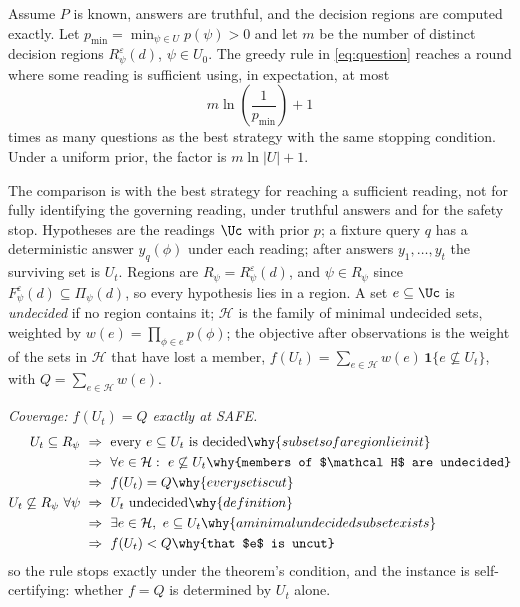 \begin{theorem}
\label{thm:query}\label{thm:questions}
Assume \(P\) is known, answers are truthful, and the decision regions are computed
exactly. Let \(p_{\min}=\min_{\psi\in U}p(\psi)>0\) and let \(m\) be the number of
distinct decision regions \(R^\varepsilon_\psi(d)\), \(\psi\in U_0\). The greedy rule
in \eqref{eq:question} reaches a round where some reading is sufficient using, in
expectation, at most
\[
m\ln\!\left(\frac{1}{p_{\min}}\right)+1
\]
times as many questions as the best strategy with the same stopping condition.
Under a uniform prior, the factor is \(m\ln|U|+1\).
\end{theorem}
The comparison is with the best strategy for reaching a sufficient reading, not for
fully identifying the governing reading, under truthful answers and for the safety stop.
Hypotheses are the readings $\Uc$ with prior $p$; a fixture query $q$ has a
deterministic answer $y_q(\phi)$ under each reading; after answers
$y_1,\dots,y_t$ the surviving set is $U_t$. Regions are
$R_\psi=R^\varepsilon_\psi(d)$, and $\psi\in R_\psi$ since
$F^\varepsilon_\psi(d)\subseteq\Pi_\psi(d)$, so every hypothesis lies in a
region. A set $e\subseteq\Uc$ is \emph{undecided} if no region contains it;
$\mathcal H$ is the family of minimal undecided sets, weighted by
$w(e)=\prod_{\phi\in e}p(\phi)$; the objective after observations is the
weight of the sets in $\mathcal H$ that have lost a member,
$f(U_t)=\sum_{e\in\mathcal H}w(e)\,\mathbf 1\{e\not\subseteq U_t\}$, with
$Q=\sum_{e\in\mathcal H}w(e)$.

\emph{Coverage: $f(U_t)=Q$ exactly at SAFE.}
\begin{align*}
U_t\subseteq R_\psi\ &\Rightarrow\ \text{every }e\subseteq U_t\text{ is decided}
   \why{subsets of a region lie in it}\\
   &\Rightarrow\ \forall e\in\mathcal H:\ e\not\subseteq U_t
   \why{members of $\mathcal H$ are undecided}\\
   &\Rightarrow\ f(U_t)=Q \why{every set is cut}\\
U_t\not\subseteq R_\psi\ \forall\psi\ &\Rightarrow\ U_t\ \text{undecided}
   \why{definition}\\
   &\Rightarrow\ \exists e\in\mathcal H,\ e\subseteq U_t
   \why{a minimal undecided subset exists}\\
   &\Rightarrow\ f(U_t)<Q \why{that $e$ is uncut}
\end{align*}
so the rule stops exactly under the theorem's condition, and the instance
is self-certifying: whether $f=Q$ is determined by $U_t$ alone.

